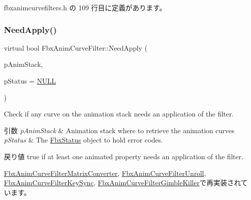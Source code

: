 fbxanimcurvefilters.\+h の 109 行目に定義があります。

\mbox{\label{class_fbx_anim_curve_filter_af95af2469851b88b4f6d38401ace5791}} 
\subsubsection{\texorpdfstring{Need\+Apply()}{NeedApply()}\hspace{0.1cm}{\footnotesize\ttfamily [1/5]}}
{\footnotesize\ttfamily virtual bool Fbx\+Anim\+Curve\+Filter\+::\+Need\+Apply (\begin{DoxyParamCaption}\item[{\hyperlink{class_fbx_anim_stack}{Fbx\+Anim\+Stack} $\ast$}]{p\+Anim\+Stack,  }\item[{\hyperlink{class_fbx_status}{Fbx\+Status} $\ast$}]{p\+Status = {\ttfamily \hyperlink{fbxarch_8h_a070d2ce7b6bb7e5c05602aa8c308d0c4}{N\+U\+LL}} }\end{DoxyParamCaption})\hspace{0.3cm}{\ttfamily [virtual]}}

Check if any curve on the animation stack needs an application of the filter. 
\begin{DoxyParams}{引数}
{\em p\+Anim\+Stack} & Animation stack where to retrieve the animation curves \\
\hline
{\em p\+Status} & The \hyperlink{class_fbx_status}{Fbx\+Status} object to hold error codes. \\
\hline
\end{DoxyParams}
\begin{DoxyReturn}{戻り値}
{\ttfamily true} if at least one animated property needs an application of the filter. 
\end{DoxyReturn}


\hyperlink{class_fbx_anim_curve_filter_matrix_converter_ad19ed98d377e10fb85c20454dbbadaae}{Fbx\+Anim\+Curve\+Filter\+Matrix\+Converter}, \hyperlink{class_fbx_anim_curve_filter_unroll_a8380c6817fbf19d347b0bd0b5ae9a57b}{Fbx\+Anim\+Curve\+Filter\+Unroll}, \hyperlink{class_fbx_anim_curve_filter_key_sync_a987ccf74bf3bdf7828812067d895950c}{Fbx\+Anim\+Curve\+Filter\+Key\+Sync}, \hyperlink{class_fbx_anim_curve_filter_gimble_killer_a3b303b3383e638e445e0bd17570be9ea}{Fbx\+Anim\+Curve\+Filter\+Gimble\+Killer}で再実装されています。

